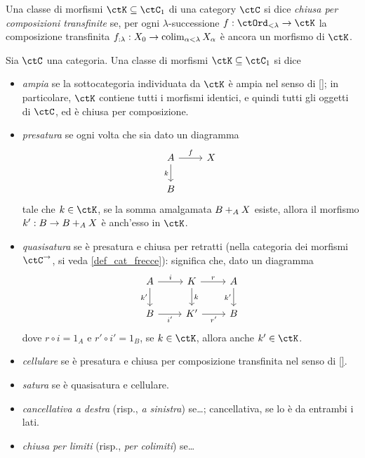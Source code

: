   \begin{definition}
    Una classe di morfismi $\ctK\subseteq\ctC_1$ di una category $\ctC$ si dice \emph{chiusa per composizioni transfinite} se, per ogni $\lambda$-successione $f : \ctOrd_{<\lambda}\to\ctK$ la composizione transfinita $f_{:\lambda} : X_0\to \colim_{\alpha < \lambda} X_\alpha$ è ancora un morfismo di $\ctK$.
  \end{definition}
\begin{definition}
  Sia $\ctC$ una categoria. Una classe di morfismi $\ctK\subseteq\ctC_1$ si dice 
  \begin{itemize}
    \item \emph{ampia} se la sottocategoria individuata da $\ctK$ è ampia nel senso di \ref{}; in particolare, $\ctK$ contiene tutti i morfismi identici, e quindi tutti gli oggetti di $\ctC$, ed è chiusa per composizione.
    \item \emph{presatura} se ogni volta che sia dato un diagramma 
      \[
        \begin{tikzcd}
          A \ar[d, "k"']\ar[r, "f"]& X \\ 
          B & 
        \end{tikzcd}
      \]
      tale che $k\in\ctK$, se la somma amalgamata $\push BXA$ esiste, allora il morfismo $k' : B\to \push BXA$ è anch'esso in $\ctK$.
    \item \emph{quasisatura} se è presatura e chiusa per retratti (nella categoria dei morfismi $\ctC^\to$, si veda \ref{def_cat_frecce}): significa che, dato un diagramma 
      \[
        \begin{tikzcd}
          A \ar[r, "i"]\ar[d, "k'"'] & K \ar[r, "r"]\ar[d, "k"]& A \ar[d, "k'"']\\
          B \ar[r, "i'"'] & K' \ar[r, "r'"'] & B
        \end{tikzcd}
      \]
      dove $r\circ i = 1_A$ e $r'\circ i' = 1_B$, se $k\in \ctK$, allora anche $k'\in\ctK$.
    \item \emph{cellulare} se è presatura e chiusa per composizione transfinita nel senso di \ref{}.
    \item \emph{satura} se è quasisatura e cellulare.
    \item \emph{cancellativa a destra} (risp., \emph{a sinistra}) se\dots; cancellativa, se lo è da entrambi i lati.
    \item \emph{chiusa per limiti} (risp., \emph{per colimiti}) se\dots
  \end{itemize}
\end{definition}
\begin{examples}
\end{examples}
